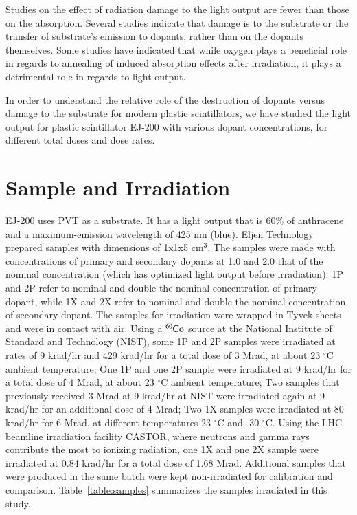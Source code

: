 \documentclass[preprint]{elsarticle}
\begin{document}
Studies on the effect of radiation damage to the light output are fewer than those on the absorption. 
Several studies indicate that damage is to the substrate or the transfer of substrate's emission to dopants, 
rather than on the dopants themselves.
Some studies have indicated that while oxygen plays a beneficial role in regards to annealing of induced absorption effects after 
irradiation, it plays a detrimental role in regards to light output\cite{Biagtan1996125}. 

In order to understand the relative role of the destruction of dopants versus damage to the substrate for modern plastic scintillators, 
we have studied the light output for plastic scintillator EJ-200 with various dopant concentrations, 
for different total doses and dose rates. 

\section{Sample and Irradiation}
EJ-200 uses PVT as a substrate. It has a light output that is 60\% of anthracene and a maximum-emission wavelength of 425 nm (blue). 
Eljen Technology prepared samples with dimensions of 1x1x5 cm$^{3}$. 
The samples were made with concentrations of primary and secondary dopants at 1.0 and 2.0 that of 
the nominal concentration (which has optimized light output before irradiation). 
1P and 2P refer to nominal and double the nominal concentration of primary dopant, 
while 1X and 2X refer to nominal and double the nominal concentration of secondary dopant.
The samples for irradiation were wrapped in Tyvek sheets and were in contact with air.
Using a $\rm {^{60}Co}$ source at the National Institute of Standard and Technology (NIST), some 1P and 2P samples were irradiated 
at rates of 9 krad/hr and 429 krad/hr for a total dose of 3 Mrad, at about 23 $^\circ$C ambient temperature;  
One 1P and one 2P sample were irradiated at 9 krad/hr for a total dose of 4 Mrad, at about 23 $^\circ$C ambient temperature; 
Two samples that previously received 3 Mrad at 9 krad/hr at NIST were irradiated again at 9 krad/hr for an additional dose of 4 Mrad;
Two 1X samples were irradiated at 80 krad/hr for 6 Mrad, at different temperatures 23 $^\circ$C and -30 $^\circ$C.
Using the LHC beamline irradiation facility CASTOR, where neutrons and gamma rays contribute the most to ionizing radiation, 
one 1X and one 2X sample were irradiated at 0.84 krad/hr for a total dose of 1.68 Mrad. 
Additional samples that were produced in the same batch were kept non-irradiated for calibration and comparison.
Table~\ref{table:samples} summarizes the samples irradiated in this study.
\end{document}

